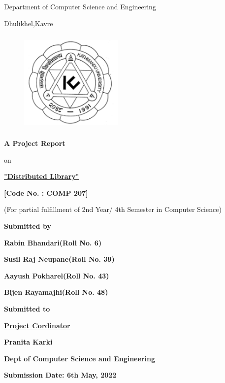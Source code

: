 \documentclass[12pt]{article}
\begin{document}
\thispagestyle{empty}

\section*{}
{\LARGE{}}

\centerline{Department of Computer Science and Engineering}
\centerline{Dhulikhel,Kavre}
\begin{figure}[h]
    \centerline{\includegraphics[width=50.546mm,height=50.546mm]{KU_Logo.png}}
\end{figure}

\centerline{\textbf{A Project Report}}
\centerline{on}
\centerline{\underline{\textbf{"Distributed Library"}}}

\vspace*{12mm}

\centerline{\textbf{[Code No. : COMP 207]}}
\centerline{(For partial fulfillment of 2nd Year/ 4th Semester in Computer Science)}

\vspace*{10mm}

\centerline{\textbf{Submitted by}}

\centerline{\textbf{Rabin Bhandari(Roll No. 6)}}
\centerline{\textbf{Susil Raj Neupane(Roll No. 39)}}
\centerline{\textbf{Aayush Pokharel(Roll No. 43)}}
\centerline{\textbf{Bijen Rayamajhi(Roll No. 48)}}


\vspace*{16mm}


\centerline{\textbf{Submitted to}}
\centerline{\underline{\textbf{Project Cordinator}}}
\centerline{\textbf{Pranita Karki}}
\centerline{\textbf{Dept of Computer Science and Engineering}}
\vspace*{10mm}

\centerline{\textbf{Submission Date: 6th May, 2022}}
\end{document}
